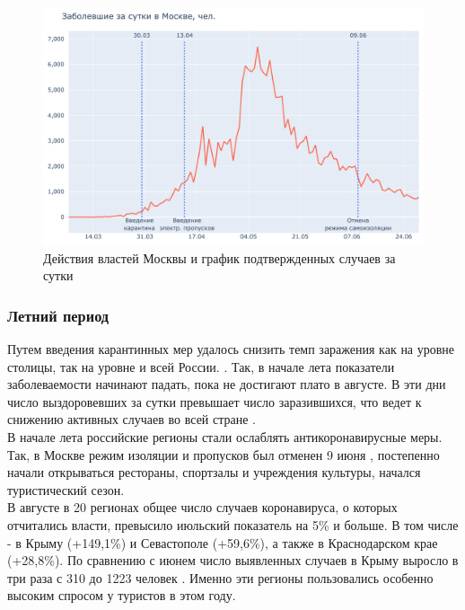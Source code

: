 \documentclass[a4paper, 12pt]{extarticle}
\begin{document}
\begin{figure}[h]
    \centering
    \includegraphics[scale=0.55]{../plots/7daily_confirmed_with_events_moscow_1.pdf}
    \caption{Действия властей Москвы и график подтвержденных случаев за сутки}
    \label{fig:day_confirmed_moscow_with_events1}
\end{figure}

\subsubsection{Летний период}
Путем введения карантинных мер удалось снизить темп заражения как на уровне
столицы, так на уровне и всей России. . Так, в начале лета показатели заболеваемости начинают падать, пока не достигают плато в августе. В эти дни число выздоровевших за сутки превышает число заразившихся, что ведет к снижению активных случаев во всей стране .
\\

В начале лета российские регионы стали ослаблять антикоронавирусные меры. Так, в Москве режим изоляции и пропусков был отменен 9 июня , постепенно начали открываться рестораны, спортзалы и учреждения культуры, начался туристический сезон.
\\

В августе в 20 регионах общее число случаев коронавируса, о которых отчитались власти, превысило июльский показатель на 5\% и больше. В том числе - в Крыму (+149,1\%) и Севастополе (+59,6\%), а также в Краснодарском крае (+28,8\%). По сравнению с июнем число выявленных случаев в Крыму выросло в три раза с 310 до 1223 человек . Именно эти регионы пользовались особенно высоким спросом у туристов в этом году.
\end{document}
